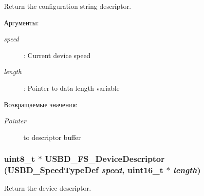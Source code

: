 Return the configuration string descriptor. 

\begin{Desc}
\item[Аргументы:]
\begin{description}
\item[{\em speed}]: Current device speed \item[{\em length}]: Pointer to data length variable \end{description}
\end{Desc}
\begin{Desc}
\item[Возвращаемые значения:]
\begin{description}
\item[{\em Pointer}]to descriptor buffer \end{description}
\end{Desc}
\hypertarget{group___u_s_b_d___d_e_s_c___private___functions_g14798be38c08a37163e53167032485ff}{
\subsubsection[{USBD\_\-FS\_\-DeviceDescriptor}]{\setlength{\rightskip}{0pt plus 5cm}uint8\_\-t $\ast$ USBD\_\-FS\_\-DeviceDescriptor (USBD\_\-SpeedTypeDef {\em speed}, \/  uint16\_\-t $\ast$ {\em length})}}
\label{group___u_s_b_d___d_e_s_c___private___functions_g14798be38c08a37163e53167032485ff}


Return the device descriptor. 

